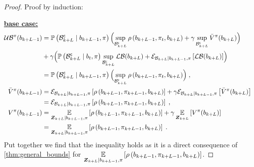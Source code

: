 \begin{proof}
	Proof by induction:

	\textbf{\underline{base case:}}
	\begin{align*}
		\upperbound\nolimits^\pi(\blf{k+L-1})&=\measure{\stcompI{\subSpace}{k+L}\mid\blf{k+L-1},\pi}\Bigl(\sup_{\stcompI{\subSpace}{k+L}}\reward{\blf{k+L-1},\pi_t,\blf{k+L}}+\gamma\sup_{\stcompI{\subSpace}{k+L}}\bar{V}^\pi(\blf{k+L})\Bigr)\\
		&+
		\gamma\Bigl(\measure{\stcompI{\subSpace}{k+L}\mid\blf{t},\pi}\sup_{\stcompI{\subSpace}{k+L}}\lowerbound(\blf{k+L})+\partialexpectation{\lowerbound(\blf{k+L})}{\subSpaceI{k+L}\mid\blf{k+L-1},\pi}\Bigr)\\
		&=\measure{\stcompI{\subSpace}{k+L}\mid\blf{k+L-1},\pi}\Bigl(\sup_{\stcompI{\subSpace}{k+L}}\reward{\blf{k+L-1},\pi_t,\blf{k+L}}\Bigr)\;,\\
		\bar{V}^\pi(\blf{k+L-1}) &=\partialexpectation{\reward{\blf{k+L-1},\pi_{k+L-1},\blf{k+L}}}{\subSpaceI{k+L}\mid\blf{k+L-1},\pi}+\gamma\partialexpectation{\bar{V}^\pi(\blf{k+L})}{\subSpaceI{k+L}\mid\blf{k+L-1},\pi}\\
		&=\partialexpectation{\reward{\blf{k+L-1},\pi_{k+L-1},\blf{k+L}}}{\subSpaceI{k+L}\mid\blf{k+L-1},\pi}\;,\\
		V^\pi(\blf{k+L-1})&=\expectation{\reward{\blf{k+L-1},\pi_{k+L-1},\blf{k+L}}}{\observationsRV{k+L}\mid\blf{k+L-1},\pi}+\gamma\expectation{V^\pi(\blf{k+L})}{\observationsRV{k+L}}\\
		&=\expectation{\reward{\blf{k+L-1},\pi_{k+L-1},\blf{k+L}}}{\observationsRV{k+L}\mid\blf{k+L-1},\pi}\;.
	\end{align*}
	Put together we find that the inequality holds as it is a direct consequence of \cref{thm:general_bounds} for $\expectation{\reward{\blf{k+L-1},\pi_{k+L-1},\blf{k+L}}}{\observationsRV{k+L}\mid\blf{k+L-1},\pi}$.


\end{proof}
